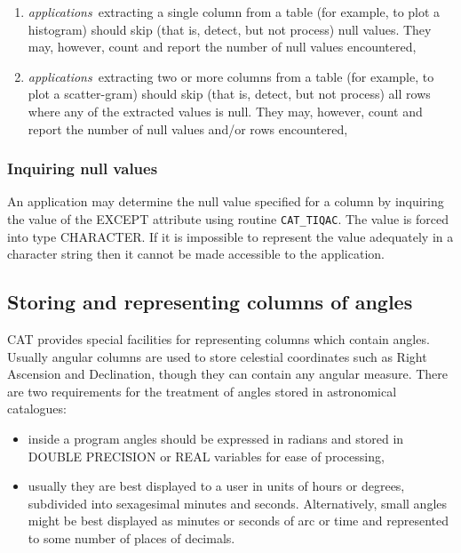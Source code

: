 \documentclass[11pt,twoside]{starlink}
\begin{document}
\begin{enumerate}

  \item \textit{applications}\, extracting a single column from a table
   (for example, to plot a histogram) should skip (that is, detect, but
   not process) null values. They may, however, count and report the
   number of null values encountered,

  \item \textit{applications}\, extracting two or more columns from a
   table (for example, to plot a scatter-gram) should skip (that is,
   detect, but not process) all rows where any of the extracted values
   is null. They may, however, count and report the number of null
   values and/or rows encountered,


\end{enumerate}

\subsubsection{Inquiring null values}

An application may determine the null value specified for a column by
inquiring the value of the EXCEPT attribute using routine \texttt{CAT\_TIQAC}. The value is forced into type CHARACTER. If it is
impossible to represent the value adequately in a character string then
it cannot be made accessible to the application.


\subsection{\label{ANGLES}Storing and representing columns of angles}

CAT provides special facilities for representing columns which
contain angles. Usually angular columns are used to store celestial
coordinates such as Right Ascension and Declination, though they can
contain any angular measure. There are two requirements for the treatment
of angles stored in astronomical catalogues:

\begin{itemize}

  \item inside a program angles should be expressed in radians
   and stored in DOUBLE PRECISION or REAL variables for ease of
   processing,

  \item usually they are best displayed to a user in units of hours
   or degrees, subdivided into sexagesimal minutes and seconds.
   Alternatively, small angles might be best displayed as minutes or
   seconds of arc or time and represented to some number of places of
   decimals.

\end{itemize}
\end{document}
